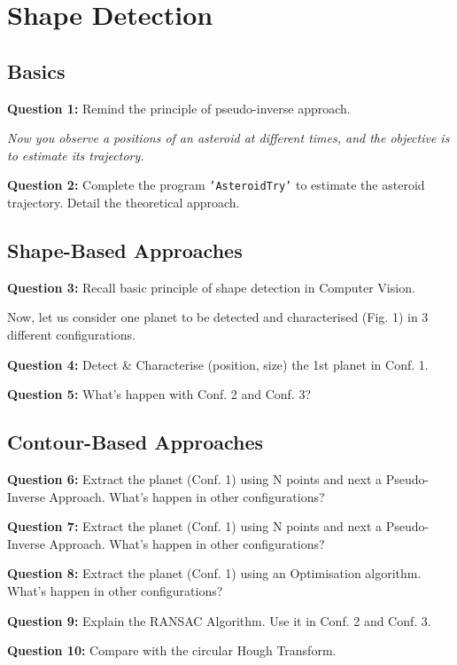 \section{Shape Detection}
\label{sec:shape_detection}

\subsection{Basics}

\textbf{Question 1:} Remind the principle of pseudo-inverse approach.

\TODO{}

\textit{Now you observe a positions of an asteroid at different times, and the objective is to estimate its trajectory.}

\textbf{Question 2:} Complete the program \texttt{'AsteroidTry'} to estimate the asteroid trajectory. Detail the theoretical approach.




\subsection{Shape-Based Approaches}

\textbf{Question 3:} Recall basic principle of shape detection in Computer Vision.

Now, let us consider one planet to be detected and characterised (Fig. 1) in 3 different configurations.

\textbf{Question 4:} Detect \& Characterise (position, size) the 1st planet in Conf. 1.

\textbf{Question 5:} What’s happen with Conf. 2 and Conf. 3?








\subsection{Contour-Based Approaches}

\textbf{Question 6:} Extract the planet (Conf. 1) using N points and next a Pseudo-Inverse Approach. What’s happen in other configurations?

\textbf{Question 7:} Extract the planet (Conf. 1) using N points and next a Pseudo-Inverse Approach. What’s happen in other configurations?

\textbf{Question 8:} Extract the planet (Conf. 1) using an Optimisation algorithm. What’s happen in other configurations?

\textbf{Question 9:} Explain the RANSAC Algorithm. Use it in Conf. 2 and Conf. 3.

\textbf{Question 10:} Compare with the circular Hough Transform.
